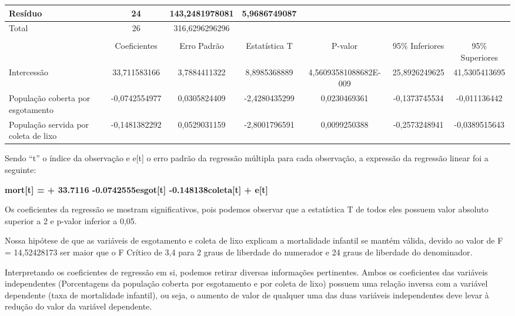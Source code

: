 \begin{table}[H]
{\begin{tabular}{|l|c|c|c|c|c|c|}
Resíduo                              & 24                    & 143,2481978081        & 5,9686749087          &                       &                       &                       \\ \hline
Total                                & 26                    & 316,6296296296        &                       &                       &                       &                       \\ \hline
                                     & \multicolumn{1}{l|}{} & \multicolumn{1}{l|}{} & \multicolumn{1}{l|}{} & \multicolumn{1}{l|}{} & \multicolumn{1}{l|}{} & \multicolumn{1}{l|}{} \\ \hline
                                     & Coeficientes          & Erro Padrão           & Estatística T         & P-valor               & 95\% Inferiores       & 95\% Superiores       \\ \hline
Intercessão                          & 33,711583166          & 3,7884411322          & 8,8985368889          & 4,56093581088682E-009 & 25,8926249625         & 41,5305413695         \\ \hline
População coberta por esgotamento    & -0,0742554977         & 0,0305824409          & -2,4280435299         & 0,0230469361          & -0,1373745534         & -0,011136442          \\ \hline
População servida por coleta de lixo & -0,1481382292         & 0,0529031159          & -2,8001796591         & 0,0099250388          & -0,2573248941         & -0,0389515643         \\ \hline
\end{tabular}%
}
\end{table}

Sendo “t” o índice da observação e e[t] o erro padrão da regressão múltipla para cada observação, a expressão da regressão linear foi a seguinte:

\textbf{mort[t] = + 33.7116 -0.0742555esgot[t] -0.148138coleta[t] + e[t]}

Os coeficientes da regressão se mostram significativos, pois podemos observar que a estatística T de todos eles possuem valor absoluto superior a 2 e p-valor inferior a 0,05.

Nossa hipótese de que as variáveis de esgotamento e coleta de lixo explicam a mortalidade infantil se mantém válida, devido ao valor de F = 14,52428173 ser maior que o F Crítico
de 3,4 para 2 graus de liberdade do numerador e 24 graus de liberdade do denominador.

Interpretando os coeficientes de regressão em si, podemos retirar diversas informações pertinentes. Ambos os coeficientes das variáveis independentes (Porcentagens da população
coberta por esgotamento e por coleta de lixo) possuem uma relação inversa com a variável dependente (taxa de mortalidade infantil), ou seja, o aumento de valor de qualquer uma das
duas variáveis independentes deve levar à redução do valor da variável dependente.


